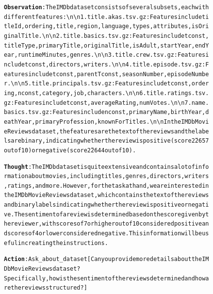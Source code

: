 \begin{enumerate}
\begin{figure}[htbp]
{{\begin{alltt}
\textbf{Observation}: The IMDb dataset consists of several subsets, each with different features:\textbackslash n\textbackslash n1. title.akas.tsv.gz: Features include titleId, ordering, title, region, language, types, attributes, isOriginalTitle.\textbackslash n\textbackslash n2. title.basics.tsv.gz: Features include tconst, titleType, primaryTitle, originalTitle, isAdult, startYear, endYear, runtimeMinutes, genres.\textbackslash n\textbackslash n3. title.crew.tsv.gz: Features include tconst, directors, writers.\textbackslash n\textbackslash n4. title.episode.tsv.gz: Features include tconst, parentTconst, seasonNumber, episodeNumber.\textbackslash n\textbackslash n5. title.principals.tsv.gz: Features include tconst, ordering, nconst, category, job, characters.\textbackslash n\textbackslash n6. title.ratings.tsv.gz: Features include tconst, averageRating, numVotes.\textbackslash n\textbackslash n7. name.basics.tsv.gz: Features include nconst, primaryName, birthYear, deathYear, primaryProfession, knownForTitles.\textbackslash n\textbackslash nIn the IMDb Movie Reviews dataset, the features are the text of the reviews and the labels are binary, indicating whether the review is positive (score \u2265 7 out of 10) or negative (score \u2264 4 out of 10).

\textbf{Thought}: The IMDb dataset is quite extensive and contains a lot of information about movies, including titles, genres, directors, writers, ratings, and more. However, for the task at hand, we are interested in the IMDb Movie Reviews dataset, which contains the text of the reviews and binary labels indicating whether the review is positive or negative. The sentiment of a review is determined based on the score given by the reviewer, with scores of 7 or higher out of 10 considered positive and scores of 4 or lower considered negative. This information will be useful in creating the instructions.

\textbf{Action}: Ask\_about\_dataset[Can you provide more details about the IMDb Movie Reviews dataset? Specifically, how is the sentiment of the reviews determined and how are the reviews structured?]


\end{alltt}}}
\end{figure}
\end{enumerate}
